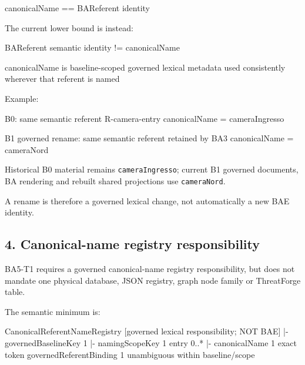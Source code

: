 \documentclass[
  10pt,
  a4paper,
]{article}
\newenvironment{Shaded}{}{}
\newcommand{\NormalTok}[1]{#1}
\begin{document}
\begin{Shaded}
\begin{Highlighting}[]
\NormalTok{canonicalName == BAReferent identity}
\end{Highlighting}
\end{Shaded}

The current lower bound is instead:

\begin{Shaded}
\begin{Highlighting}[]
\NormalTok{BAReferent semantic identity}
\NormalTok{    != canonicalName}

\NormalTok{canonicalName}
\NormalTok{    is baseline{-}scoped governed lexical metadata}
\NormalTok{    used consistently wherever that referent is named}
\end{Highlighting}
\end{Shaded}

Example:

\begin{Shaded}
\begin{Highlighting}[]
\NormalTok{B0:}
\NormalTok{  same semantic referent R{-}camera{-}entry}
\NormalTok{  canonicalName = cameraIngresso}

\NormalTok{B1 governed rename:}
\NormalTok{  same semantic referent retained by BA3}
\NormalTok{  canonicalName = cameraNord}
\end{Highlighting}
\end{Shaded}

Historical B0 material remains \texttt{cameraIngresso}; current B1
governed documents, BA rendering and rebuilt shared projections use
\texttt{cameraNord}.

A rename is therefore a governed lexical change, not automatically a new
BAE identity.

\subsection{4. Canonical-name registry
responsibility}\label{canonical-name-registry-responsibility}

BA5-T1 requires a governed canonical-name registry responsibility, but
does not mandate one physical database, JSON registry, graph node family
or ThreatForge table.

The semantic minimum is:

\begin{Shaded}
\begin{Highlighting}[]
\NormalTok{CanonicalReferentNameRegistry             [governed lexical responsibility; NOT BAE]}
\NormalTok{|{-} governedBaselineKey               1}
\NormalTok{|{-} namingScopeKey                    1}
\NormalTok{\textasciigrave{}{-} entry                             0..*}
\NormalTok{     |{-} canonicalName                1 exact token}
\NormalTok{     \textasciigrave{}{-} governedReferentBinding      1 unambiguous within baseline/scope}
\end{Highlighting}
\end{Shaded}
\end{document}
